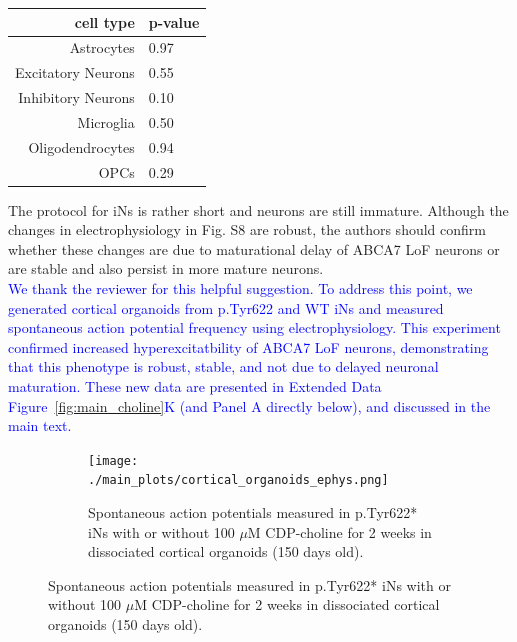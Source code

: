 \documentclass[12pt]{article}
\begin{document}
\begin{table}[H]
	\centering
	\begin{tabular}{rl}
	\toprule
	cell type & p-value \\
	\midrule
	Astrocytes & 0.97 \\
	Excitatory Neurons & 0.55 \\
	Inhibitory Neurons & 0.10 \\
	Microglia & 0.50 \\
	Oligodendrocytes & 0.94 \\
	OPCs & 0.29 \\
	\bottomrule
	\end{tabular}
\end{table}

The protocol for iNs is rather short and neurons are still immature. Although the changes in electrophysiology in Fig. S8 are robust, the authors should confirm whether these changes are due to maturational delay of ABCA7 LoF neurons or are stable and also persist in more mature neurons.\\
\textcolor{blue}{We thank the reviewer for this helpful suggestion. To address this point, we generated cortical organoids from p.Tyr622 and WT iNs and measured spontaneous action potential frequency using electrophysiology. This experiment confirmed increased hyperexcitatbility of ABCA7 LoF neurons, demonstrating that this phenotype is robust, stable, and not due to delayed neuronal maturation. These new data are presented in Extended Data Figure~\ref{fig:main_choline}K (and Panel A directly below), and discussed in the main text.}

\begin{figure}[H]
	\centering
	\begin{subfigure}[t]{.4\textwidth}
	\caption{Spontaneous action potentials measured in p.Tyr622* iNs with or without 100 $\mu$M CDP-choline for 2 weeks in dissociated cortical organoids (150 days old).}
	\texttt{[image: ./main\_plots/cortical\_organoids\_ephys.png]}        
	\end{subfigure}       
\end{figure}
\end{document}
